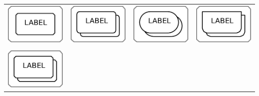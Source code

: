 \begin{table}[h]
\begin{tabu}{X[c,m]X[c,m]X[c,m]X[c,m]}
    \includegraphics[scale=0.8, valign=m]{images/build/complex_subunit.pdf} & \includegraphics[scale=0.8, valign=m]{images/build/macromolecule_multimer_subunit.pdf} & \includegraphics[scale=0.8, valign=m]{images/build/simple_chemical_multimer_subunit.pdf} & \includegraphics[scale=0.8, valign=m]{images/build/genetic_multimer_subunit.pdf}\\[0.2cm]
     &  &  & \\[0.5cm]
    \includegraphics[scale=0.8, valign=m]{images/build/complex_multimer_subunit.pdf} &  &  & \\[0.2cm]

\end{tabu}
\end{table}
